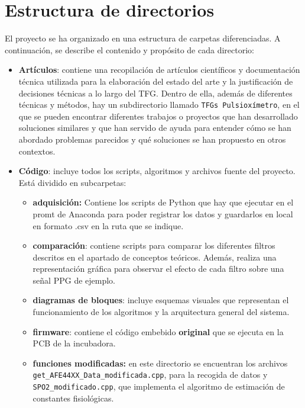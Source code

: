 
\section{Estructura de directorios}

El proyecto se ha organizado en una estructura de carpetas diferenciadas. A continuación, se describe el contenido y propósito de cada directorio:

\begin{itemize}
    \item \textbf{Artículos}: contiene una recopilación de artículos científicos y documentación técnica utilizada para la elaboración del estado del arte y la justificación de decisiones técnicas a lo largo del TFG. Dentro de ella, además de diferentes técnicas y métodos, hay un subdirectorio llamado \texttt{TFGs Pulsioxímetro}, en el que se pueden encontrar diferentes trabajos o proyectos que han desarrollado soluciones similares y que han servido de ayuda para entender cómo se han abordado problemas parecidos y qué soluciones se han propuesto en otros contextos.

   \item \textbf{Código}: incluye todos los scripts, algoritmos y archivos fuente del proyecto. Está dividido en subcarpetas:
\begin{itemize}

    \item \textbf{adquisición:} Contiene los scripts de Python que hay que ejecutar en el promt de Anaconda para poder registrar los datos y guardarlos en local en formato .csv en la ruta que se indique.
    
    \item \textbf{comparación}: contiene scripts para comparar los diferentes filtros descritos en el apartado de conceptos teóricos. Además, realiza una representación gráfica para observar el efecto de cada filtro sobre una señal PPG de ejemplo.
    
    \item \textbf{diagramas de bloques}: incluye esquemas visuales que representan el funcionamiento de los algoritmos y la arquitectura general del sistema.

    \item \textbf{firmware}: contiene el código embebido \textbf{original} que se ejecuta en la PCB de la incubadora. 

    \item \textbf{funciones modificadas:} en este directorio se encuentran los archivos \texttt{get\_AFE44XX\_Data\_modificada.cpp}, para la recogida de datos y \texttt{SPO2\_modificado.cpp}, que implementa el algoritmo de estimación de constantes fisiológicas. 
    

\end{itemize}
\end{itemize}
